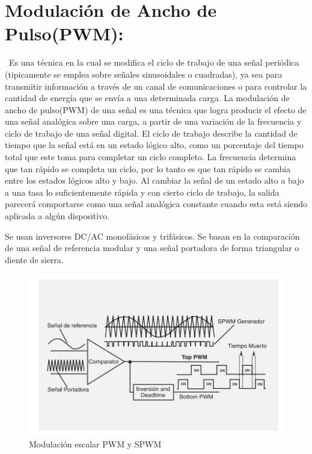 \documentclass[12pt,letterpaper]{article}
\begin{document}
\section{Modulación de Ancho de Pulso(PWM):}
\
Es una técnica en la cual se modifica el ciclo de trabajo de una señal periódica (tipicamente se emplea sobre señales sinusoidales o cuadradas), ya sea para transmitir información a través de un canal de comunicaciones o para controlar la cantidad de energía que se envía a una determinada carga.
La modulación de ancho de pulso(PWM) de una señal es una técnica que logra producir el efecto de una señal analógica sobre una carga, a partir de una variación de la frecuencia y ciclo de trabajo de una señal digital. El ciclo de trabajo describe la cantidad de tiempo que la señal está en un estado lógico alto, como un porcentaje del tiempo total que este toma para completar un ciclo completo. La frecuencia determina que tan rápido se completa un ciclo, por lo tanto es que tan rápido se cambia entre los estados lógicos alto y bajo. Al cambiar la señal de un estado alto a bajo a una tasa lo suficientemente rápida y con cierto ciclo de trabajo, la salida parecerá comportarse como una señal analógica constante cuando esta está siendo aplicada a algún dispositivo.
\

Se usan inversores DC/AC monofásicos y trifásicos. Se basan en la comparación de una señal de referencia modular y una señal portadora de forma triangular o diente de sierra.
\

\begin{figure}[h!]
\begin{center}

\includegraphics[scale=0.8]{PWM.png} 
\caption{Modulación escalar PWM y SPWM}
\end{center}
\end{figure}
\
\end{document}
